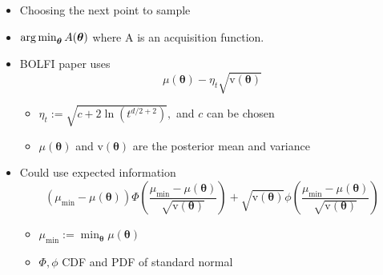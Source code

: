\begin{itemize}
    \item Choosing the next point to sample
    \item $\operatorname*{arg\,min}_{\bm{\theta}}A(\bm\theta)$ where A is an acquisition function.
    \item BOLFI paper uses $$\mu(\bm\theta) - \eta_t\sqrt{\mathrm{v}(\bm\theta)}$$ \begin{itemize}
              \item $\eta_t:= \sqrt{c + 2\ln(t^{d/2 + 2})},$ and $c$ can be chosen
              \item $\mu(\bm\theta)$ and $\mathrm{v}(\bm\theta)$ are the posterior mean and variance
          \end{itemize}
    \item Could use expected information $$(\mu_\text{min} - \mu(\bm\theta))
              \varPhi\left(\frac{\mu_\text{min} - \mu(\bm\theta)}{\sqrt{\mathrm{v}(\bm\theta)}}\right) + \sqrt{\mathrm{v}(\bm\theta)}
              \phi\left(\frac{\mu_\text{min} - \mu(\bm\theta)}{\sqrt{\mathrm{v}(\bm\theta)}}\right)$$\begin{itemize}
              \item $\mu_\text{min} := \min_{\bm{\theta}} \mu(\bm\theta)$
              \item $\varPhi, \phi$ CDF and PDF of standard normal
          \end{itemize}
\end{itemize}